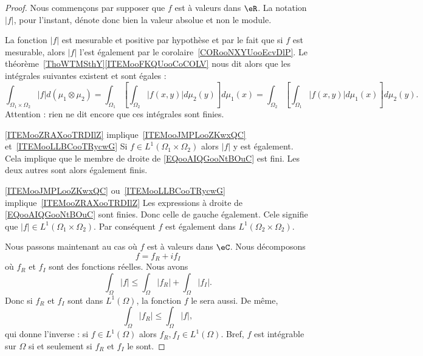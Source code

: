 \begin{proof}

    Nous commençons par supposer que \( f\) est à valeurs dans \( \eR\). La notation \( | f |\), pour l'instant,  dénote donc bien la valeur absolue et non le module.

    La fonction \( | f |\) est mesurable et positive par hypothèse et par le fait que si \( f\) est mesurable, alors \( | f |\) l'est également par le corolaire~\ref{CORooNXYUooEcvDlP}. Le théorème~\ref{ThoWTMSthY}\ref{ITEMooFKQUooCoCOLV} nous dit alors que les intégrales suivantes existent et sont égales :
    \begin{equation}        \label{EQooAIQGooNtBOuC}
            \int_{\Omega_1\times \Omega_2}| f |d(\mu_1\otimes \mu_2)=\int_{\Omega_1}\left[ \int_{\Omega_2}|f(x,y)|d\mu_2(y) \right]d\mu_1(x)
            =\int_{\Omega_2}\left[ \int_{\Omega_1}|f(x,y)|d\mu_1(x) \right]d\mu_2(y).
    \end{equation}
    Attention : rien ne dit encore que ces intégrales sont finies.

    \begin{subproof}
        \item[\ref{ITEMooZRAXooTRDIlZ} implique~\ref{ITEMooJMPLooZKwxQC} et~\ref{ITEMooLLBCooTRycwG}]
            Si \( f\in L^1(\Omega_1\times \Omega_2)\) alors \( | f |\) y est également. Cela implique que le membre de droite de \eqref{EQooAIQGooNtBOuC} est fini. Les deux autres sont alors également finis.
        \item[\ref{ITEMooJMPLooZKwxQC} ou~\ref{ITEMooLLBCooTRycwG} implique~\ref{ITEMooZRAXooTRDIlZ}]
            Les expressions à droite de \eqref{EQooAIQGooNtBOuC} sont finies. Donc celle de gauche également. Cele signifie que \( | f |\in L^1(\Omega_1\times \Omega_2)\). Par conséquent \( f\) est également dans \(L^1(\Omega_2\times \Omega_2) \).
    \end{subproof}

    Nous passons maintenant au cas où \( f\) est à valeurs dans \( \eC\). Nous décomposons
    \begin{equation}
        f=f_R+if_I
    \end{equation}
    où \( f_R\) et \( f_I\) sont des fonctions réelles. Nous avons
    \begin{equation}        \label{EQooZEOAooIMwKwk}
        \int_{\Omega}| f |\leq \int_{\Omega}| f_R |+\int_{\Omega}| f_I |.
    \end{equation}
    Donc si \( f_R\) et \( f_I\) sont dans \( L^1(\Omega)\), la fonction \( f\) le sera aussi. De même,
    \begin{equation}
        \int_{\Omega}| f_R |\leq \int_{\Omega}| f |,
    \end{equation}
    qui donne l'inverse : si \( f\in L^1(\Omega)\) alors \( f_R,f_I\in L^1(\Omega)\). Bref, \( f\) est intégrable sur \( \Omega\) si et seulement si \( f_R\) et \( f_I\) le sont.


\end{proof}
